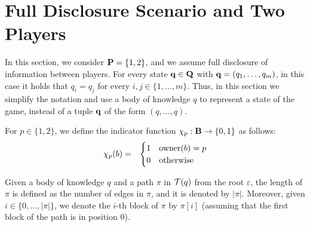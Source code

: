 

\section{Full Disclosure Scenario and Two Players}
In this section, we consider $\mathbf{P} = \{1,2\}$, and we assume full disclosure of information between players.
For every state $\mathbf{q} \in \mathbf{Q}$ with $\mathbf{q} = (q_1, \ldots, q_m)$, in this case it holds that $q_i = q_j$ for every $i,j \in \{1, \ldots, m\}$. Thus, in this section we simplify the notation and use a body of knowledge $q$ to represent a state of the game, instead of a tuple $\mathbf{q}$ of the form $(q, \ldots, q)$.

For $p \in \{1,2\}$, we define the indicator  function $\chi_p : \mathbf{B} \to \{0,1\}$ as follows:
\begin{eqnarray*}
\chi_p(b) & = & 
\begin{cases}
1 & \text{owner}(b) = p\\
0 & \text{otherwise}
\end{cases}
\end{eqnarray*}

Given a body of knowledge $q$ and a path $\pi$ in $\mathcal{T}(q)$ from the root $\varepsilon$, the length of $\pi$ is defined as the number of edges in $\pi$, and it is denoted by $|\pi|$. Moreover, given $i \in \{0, \ldots, |\pi|\}$, we denote the $i$-th block of
 $\pi$ by $\pi[i]$ (assuming that the first block of the path is in position 0). 
 
